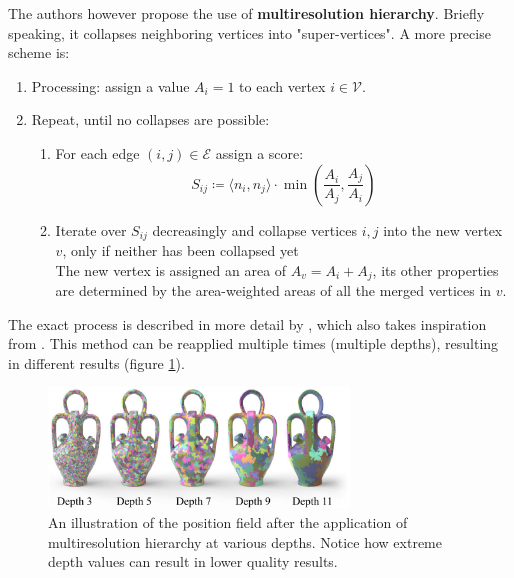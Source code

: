 \documentclass{ACGSeminar}
\begin{document}
The authors however propose the use of \textbf{multiresolution hierarchy}. Briefly speaking, it collapses neighboring vertices into "super-vertices". A more precise scheme is:
\begin{enumerate}
	\item	Processing: assign a value $A_i = 1$ to each vertex $i \in \mathcal{V}$.
	\item	Repeat, until no collapses are possible:
			\begin{enumerate}
				\item	For each edge $(i,j) \in \mathcal{E}$ assign a score:
						\begin{equation*}
							S_{ij} \coloneqq \langle n_i, n_j \rangle \cdot \min(\frac{A_i}{A_j}, \frac{A_j}{A_i})
						\end{equation*}
				\item	Iterate over $S_{ij}$ decreasingly and collapse vertices $i,j$ into the new vertex $v$, only if neither has been collapsed yet\\
						The new vertex is assigned an area of $A_v = A_i + A_j$, its other properties are determined by the area-weighted areas of all the merged vertices in $v$.
			\end{enumerate}
\end{enumerate}
The exact process is described in more detail by \cite{jakob2015instant}, which also takes inspiration from \cite{botsch2006primo}. This method can be reapplied multiple times (multiple depths), resulting in different results (figure \ref{fig:multireolution-hierarchy-depths}).

\begin{figure}[htb!]
	\begin{centering}
		\includegraphics[width=8cm]{img/multiresolution-hierarchy-depths.png}\par
	\end{centering}
	\caption{An illustration of the position field after the application of multiresolution hierarchy at various depths. Notice how extreme depth values can result in lower quality results. \cite{jakob2015instant}}
	\label{fig:multireolution-hierarchy-depths}
\end{figure}
\end{document}

